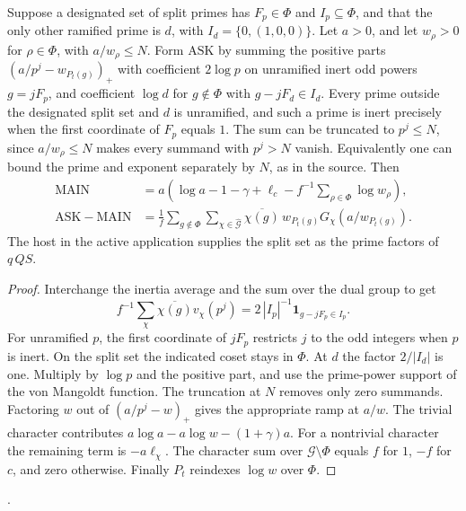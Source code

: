 \begin{lemma}\label{ar:balance}
Suppose a designated set of split primes has \(F_p\in\Phi\) and \(I_p\subseteq\Phi\), and that the only other ramified prime is \(d\), with \(I_d=\{0,(1,0,0)\}\). Let \(a>0\), and let \(w_\rho>0\) for \(\rho\in\Phi\), with \(a/w_\rho\le N\). Form \(\mathrm{ASK}\) by summing the positive parts \((a/p^j-w_{P_t(g)})_+\) with coefficient \(2\log p\) on unramified inert odd powers \(g=jF_p\), and coefficient \(\log d\) for \(g\notin\Phi\) with \(g-jF_d\in I_d\). Every prime outside the designated split set and \(d\) is unramified, and such a prime is inert precisely when the first coordinate of \(F_p\) equals \(1\). The sum can be truncated to \(p^j\le N\), since \(a/w_\rho\le N\) makes every summand with \(p^j>N\) vanish. Equivalently one can bound the prime and exponent separately by \(N\), as in the source. Then
\begin{align}
 \mathrm{MAIN}
 &=a\left(\log a-1-\gamma+\ell_c-f^{-1}\sum_{\rho\in\Phi}\log w_\rho\right),\nonumber\\
 \mathrm{ASK}-\mathrm{MAIN}
 &= \frac1f\sum_{g\notin\Phi}\sum_{\chi\in\widehat{\mathcal G}}
     \overline{\chi(g)}\,w_{P_t(g)}G_\chi(a/w_{P_t(g)}).
 \label{ar:balanceeq}
\end{align}
The host in the active application supplies the split set as the prime factors of \(q\,QS\).
\end{lemma}
\begin{proof}
Interchange the inertia average and the sum over the dual group to get
\[
 f^{-1}\sum_\chi\overline{\chi(g)}v_\chi(p^j)
 =2\,|I_p|^{-1}\mathbf1_{g-jF_p\in I_p}.
\]
For unramified \(p\), the first coordinate of \(jF_p\) restricts \(j\) to the odd integers when \(p\) is inert. On the split set the indicated coset stays in \(\Phi\). At \(d\) the factor \(2/|I_d|\) is one. Multiply by \(\log p\) and the positive part, and use the prime-power support of the von Mangoldt function. The truncation at \(N\) removes only zero summands. Factoring \(w\) out of \((a/p^j-w)_+\) gives the appropriate ramp at \(a/w\). The trivial character contributes \(a\log a-a\log w-(1+\gamma)a\). For a nontrivial character the remaining term is \(-a\ell_\chi\). The character sum over \(\mathcal G\setminus\Phi\) equals \(f\) for \(1\), \(-f\) for \(c\), and zero otherwise. Finally \(P_t\) reindexes \(\log w\) over \(\Phi\).
\end{proof}
\noindent
{}\quad
{}\quad
{}.

